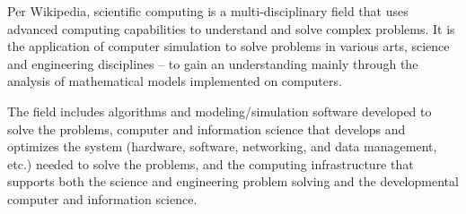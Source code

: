 \documentclass[letterpapper,12pt]{article}
\begin{document}
Per Wikipedia, scientific computing is a multi-disciplinary field that 
uses advanced computing capabilities to understand and solve complex 
problems. It is the application of computer simulation to solve problems
in various arts, science and engineering disciplines -- to gain an 
understanding mainly through the analysis of mathematical models 
implemented on computers.

The field includes algorithms and modeling/simulation software developed
to solve the problems, computer and information science that develops and
optimizes the system (hardware, software, networking, and data management,
etc.) needed to solve the problems, and the computing infrastructure that
supports both the science and engineering problem solving and the 
developmental computer and information science.

\end{document}
